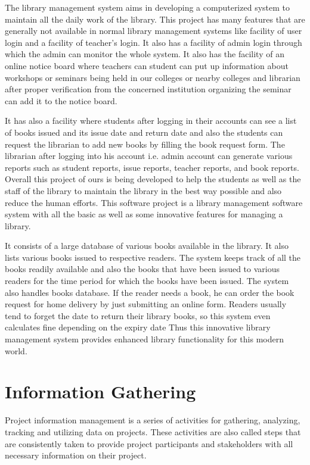 \documentclass[12pt, a4paper]{report}
\begin{document}
The library management system aims in developing a computerized system to maintain all the daily work of the library. This project has many
features that are generally not available in normal library management systems like facility of user login and a facility of teacher’s login. It also has a
facility of admin login through which the admin can monitor the whole system. It also has the facility of an online notice board where teachers can
student can put up information about workshops or seminars being held in our colleges or nearby colleges and librarian after proper verification
from the concerned institution organizing the seminar can add it to the notice board. \par It has also a facility where students after logging in their
accounts can see a list of books issued and its issue date and return date and also the students can request the librarian to add new books by filling
the book request form. The librarian after logging into his account i.e. admin account can generate various reports such as student reports, issue
reports, teacher reports, and book reports. Overall this project of ours is being developed to help the students as well as the staff of the library to
maintain the library in the best way possible and also reduce the human efforts.
This software project is a library management software system with all the basic as well as some innovative features for managing a library. \par It consists of a large database of various books available in the library. It also lists various books issued to respective readers. The system keeps track
of all the books readily available and also the books that have been issued to various readers for the time period for which the books have been
issued. The system also handles books database. If the reader needs a book, he can order the book request for home delivery by just submitting an
online form. Readers usually tend to forget the date to return their library books, so this system even calculates fine depending on the expiry date
Thus this innovative library management system provides enhanced library functionality for this modern world.

\newpage
\section{Information Gathering}

\par Project information management is a series of activities for gathering, analyzing, tracking and utilizing data on projects. These activities are also called steps that are consistently taken to provide project participants and stakeholders with all necessary information on their project.
\end{document}
